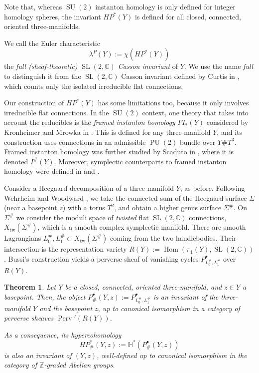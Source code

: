 \documentclass [11pt]{amsart}
\newtheorem {theorem}{Theorem}[section]
\theoremstyle{remark}
\def\zz {{\mathbb{Z}}}
\def\cc {{\mathbb{C}}}
\def\Z {\zz}
\def\HP{\mathit{HP}}
\def\HH{\mathbb{H}}
\def\sl {{\operatorname{SL}(2, \cc)}}
\def\su {{\operatorname{SU}(2)}}
\def\pu {{\operatorname{PU}(2)}}
\def\Rep {R}
\def\Char {X}
\def\Hom {\operatorname{Hom}}
\def\Perv {\operatorname{Perv}}
\def\HPf{\HP_{\! \#}}
\def\tw{\operatorname{tw}}
\begin{document}
Note that, whereas $\su$ instanton homology is only defined for integer homology spheres, the invariant $\HP^*(Y)$ is defined for all closed, connected, oriented three-manifolds.

We call the Euler characteristic
$$ \lambda^{P}(Y) := \chi(\HP^*(Y))$$
 the {\em full (sheaf-theoretic) $\sl$ Casson invariant} of $Y$. We use the name {\em full} to distinguish it from the $\sl$ Casson invariant defined by Curtis in \cite{Curtis}, which counts only the isolated irreducible flat connections.
 
Our construction of $\HP^*(Y)$ has some limitations too, because it only involves irreducible flat connections. In the $\su$ context, one theory that takes into account the reducibles is the {\em framed instanton homology} $\mathit{FI}_*(Y)$ considered by Kronheimer and Mrowka in \cite{KMknots}. This is defined for any three-manifold $Y$, and its construction uses connections in an admissible $\pu$ bundle over $Y \# T^3$. Framed instanton homology was further studied by Scaduto in \cite{Scaduto}, where it is denoted $I^\#(Y)$. Moreover, symplectic counterparts to framed instanton homology were defined in \cite{WWFloerField} and \cite{MWextended}.

Consider a Heegaard decomposition of a three-manifold $Y$, as before. Following Wehrheim and Woodward \cite[Section 4.4]{WWFloerField}, we take the connected sum of the Heegaard surface $\Sigma$ (near a basepoint $z$) with a torus $T^2$, and obtain a higher genus surface $\Sigma^\#$. On $\Sigma^\#$ we consider the moduli space of {\em twisted} flat $\sl$ connections, $\Char_{\tw}(\Sigma^{\#})$, which is a smooth complex symplectic manifold. There are smooth Lagrangians $L_0^{\#} , L_1^{\#} \subset  \Char_{\tw}(\Sigma^{\#})$ coming from the two handlebodies. Their intersection is the representation variety $\Rep(Y) := \Hom(\pi_1(Y), \sl)$. Bussi's construction yields a perverse sheaf of vanishing cycles $P^{\bullet}_{L^{\#}_0, L^{\#}_1}$ over $\Rep(Y)$.

\begin{theorem}
\label{thm:framed}
Let $Y$ be a closed, connected, oriented three-manifold, and $z \in Y$ a basepoint. Then, the object $P^{\bullet}_\#(Y,z):=P^{\bullet}_{L_0^\#, L_1^\#}$ is an invariant of the three-manifold $Y$ and the basepoint $z$, up to canonical isomorphism in a category of perverse sheaves $\Perv'(\Rep(Y))$.

As a consequence, its hypercohomology
$$  \HPf^*(Y,z) := \HH^*( P^{\bullet}_{\#}(Y, z))$$
is also an invariant of $(Y, z)$, well-defined up to canonical isomorphism in the category of $\Z$-graded Abelian groups. 
\end{theorem}
\end{document}
